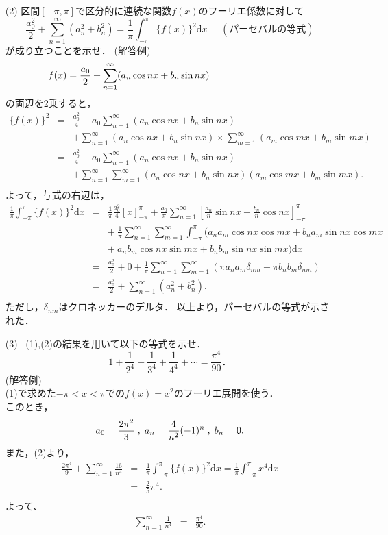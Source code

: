 \documentclass[11pt]{jsarticle}
\begin{document}
\begin{enumerate}
\begin{enumerate}
\item[(2)]  区間$[-\pi,\pi]$で区分的に連続な関数$f(x)$のフーリエ係数に対して
\[
\frac{a_0^2}2+\sum_{n=1}^{\infty}(a_n^2+b_n^2)=\frac1{\pi}\int_{-\pi}^\pi\{f(x)\}^2\mathrm{d}x \;\;\;\;\; (パーセバルの等式)
\]
が成り立つことを示せ．
(解答例)\\
\[\hspace{-3cm}
f(x) = \frac{a_0}{2}+\sum^{\infty}_{n=1}(a_{n}\cos nx +b_{n}\sin nx)
\]
の両辺を2乗すると，
\begin{eqnarray*}
\{f(x)\}^2 &=& \frac{a_0^2}4+a_0\sum^{\infty}_{n=1}(a_{n}\cos nx +b_{n}\sin nx) \\
&&+ \sum^{\infty}_{n=1}(a_{n}\cos nx +b_{n}\sin nx)\times\sum^\infty_{m=1}(a_m\cos mx +b_m\sin mx) \\[8pt]
&=& \frac{a_0^2}4+a_0\sum^{\infty}_{n=1}(a_{n}\cos nx +b_{n}\sin nx) \\
&&+ \sum^{\infty}_{n=1}\sum^\infty_{m=1}(a_{n}\cos nx +b_{n}\sin nx)(a_m\cos mx +b_m\sin mx).\\
\end{eqnarray*}
%
よって，与式の右辺は，
%
\begin{eqnarray*}
\frac1{\pi}\int_{-\pi}^\pi\{f(x)\}^2\mathrm{d}x &=& \frac1\pi\frac{a_0^2}4\left[x\right]_{-\pi}^\pi+\frac{a_0}\pi\sum_{n=1}^\infty\left[\frac{a_n}n\sin nx-\frac{b_n}n\cos nx\right]_{-\pi}^\pi \\
&&+ \ \frac1\pi\sum^{\infty}_{n=1}\sum^\infty_{m=1}\int_{-\pi}^\pi(a_na_m\cos nx\cos mx+b_na_m\sin nx\cos mx \\[5pt]
&&+ \ a_nb_m\cos nx\sin mx+b_nb_m\sin nx\sin mx)\mathrm{d}x \\[5pt]
&=& \frac{a_0^2}2+0+\frac1\pi\sum^{\infty}_{n=1}\sum^\infty_{m=1}(\pi a_na_m\delta_{nm}+\pi b_nb_m\delta_{nm}) \\
&=& \frac{a_0^2}2+\sum^{\infty}_{n=1}(a_n^2+b_n^2).\\
\end{eqnarray*}
ただし，$\delta_{nm}$はクロネッカーのデルタ．
以上より，パーセバルの等式が示された．\\



\item[(3)]  \ (1),(2)の結果を用いて以下の等式を示せ．
\[
1+\frac1{2^4}+\frac1{3^4}+\frac1{4^4}+\cdots=\frac{\pi^4}{90}．
\]
(解答例)\\
(1)で求めた$-\pi<x<\pi$での$f(x)=x^2$のフーリエ展開を使う．\\
このとき，\\
\[
a_0 =\frac{2\pi^2}3 \; , \; 
a_n = \frac4{n^2}(-1)^n \; , \;
b_n = 0.\\[8pt]
\]
また，(2)より，
\begin{eqnarray*}
\frac{2\pi^4}9+\sum_{n=1}^\infty\frac{16}{n^4} &=& \frac1\pi\int_{-\pi}^\pi\{f(x)\}^2\mathrm{d}x =
\frac1\pi\int_{-\pi}^\pi x^4\mathrm{d}x \\[8pt]
&=& \frac25\pi^4. \\
\end{eqnarray*}
よって、
\begin{eqnarray*}
\sum_{n=1}^\infty\frac1{n^4} &=& \frac{\pi^4}{90}.
\end{eqnarray*}
\end{enumerate}



\end{enumerate}
\end{document}
